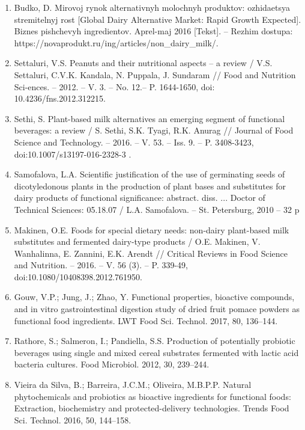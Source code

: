 \begin{enumerate}
\item
Bud\textquotesingle ko, D. Mirovoj rynok
al\textquotesingle ternativnyh molochnyh produktov: ozhidaetsya
stremitel\textquotesingle nyj rost {[}Global Dairy Alternative Market:
Rapid Growth Expected{]}. Biznes pishchevyh ingredientov.
Aprel\textquotesingle-maj 2016 {[}Tekst{]}. -- Rezhim dostupa:
https://novaprodukt.ru/ing/articles/non\_dairy\_milk/.

\item
Settaluri, V.S. Peanuts and their nutritional aspects -- a review /
V.S. Settaluri, C.V.K. Kandala, N. Puppala, J. Sundaram // Food and
Nutrition Sci-ences. -- 2012. -- V. 3. -- No. 12.-- P. 1644-1650, doi:
10.4236/fns.2012.312215.

\item
Sethi, S. Plant-based milk alternatives an emerging segment of
functional beverages: a review / S. Sethi, S.K. Tyagi, R.K. Anurag //
Journal of Food Science and Technology. -- 2016. -- V. 53. -- Iss. 9. --
P. 3408-3423, doi:10.1007/s13197-016-2328-3 .

\item
Samofalova, L.A. Scientific justification of the use of germinating
seeds of dicotyledonous plants in the production of plant bases and
substitutes for dairy products of functional significance: abstract.
diss. ... Doctor of Technical Sciences: 05.18.07 / L.A. Samofalova. --
St. Petersburg, 2010 -- 32 p

\item
Makinen, O.E. Foods for special dietary needs: non-dairy plant-based
milk substitutes and fermented dairy-type products / O.E. Makinen, V.
Wanhalinna, E. Zannini, E.K. Arendt // Critical Reviews in Food Science
and Nutrition. -- 2016. -- V. 56 (3). -- P. 339-49,
doi:10.1080/10408398.2012.761950.

\item
Gouw, V.P.; Jung, J.; Zhao, Y. Functional properties, bioactive
compounds, and in vitro gastrointestinal digestion study of dried fruit
pomace powders as functional food ingredients. LWT Food Sci. Technol.
2017, 80, 136--144.

\item
Rathore, S.; Salmeron, I.; Pandiella, S.S. Production of potentially
probiotic beverages using single and mixed cereal substrates fermented
with lactic acid bacteria cultures. Food Microbiol. 2012, 30, 239--244.

\item
Vieira da Silva, B.; Barreira, J.C.M.; Oliveira, M.B.P.P. Natural
phytochemicals and probiotics as bioactive ingredients for functional
foods: Extraction, biochemistry and protected-delivery technologies.
Trends Food Sci. Technol. 2016, 50, 144--158.


\end{enumerate}
